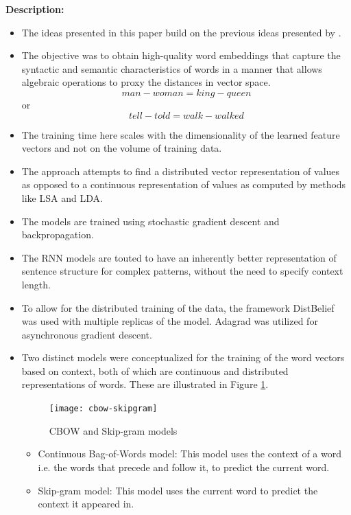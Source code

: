 \documentclass[11pt,a4paper]{article}
\begin{document}
  \textbf{Description:}
  \begin{itemize}
    \item 
    The ideas presented in this paper build on the previous ideas presented by \cite{bengio2003neural}.
    \item 
    The objective was to obtain high-quality word embeddings that capture the syntactic and semantic characteristics of words in a manner that allows algebraic operations to proxy the distances in vector space.
    $$man - woman = king - queen$$ or $$tell - told = walk - walked$$
    \item
    The training time here scales with the dimensionality of the learned feature vectors and not on the volume of training data.
    \item
    The approach attempts to find a distributed vector representation of values as opposed to a continuous representation of values as computed by methods like LSA and LDA.
    \item
    The models are trained using stochastic gradient descent and backpropagation.
    \item
    The RNN models are touted to have an inherently better representation of sentence structure for complex patterns, without the need to specify context length.
    \item
    To allow for the distributed training of the data, the framework DistBelief was used with multiple replicas of the model. Adagrad was utilized for asynchronous gradient descent.
    \item
    Two distinct models were conceptualized for the training of the word vectors based on context, both of which are continuous and distributed representations of words. These are illustrated in Figure \ref{fig:cbow-skipgram}.
    \begin{figure}[ht]
      \centering
      \texttt{[image: cbow-skipgram]}
      \caption{CBOW and Skip-gram models}
      \label{fig:cbow-skipgram}
    \end{figure}
    \begin{itemize}
      \item
      Continuous Bag-of-Words model: This model uses the context of a word i.e. the words that precede and follow it, to predict the current word.
      \item
      Skip-gram model: This model uses the current word to predict the context it appeared in.
    \end{itemize}
  \end{itemize}
\end{document}
